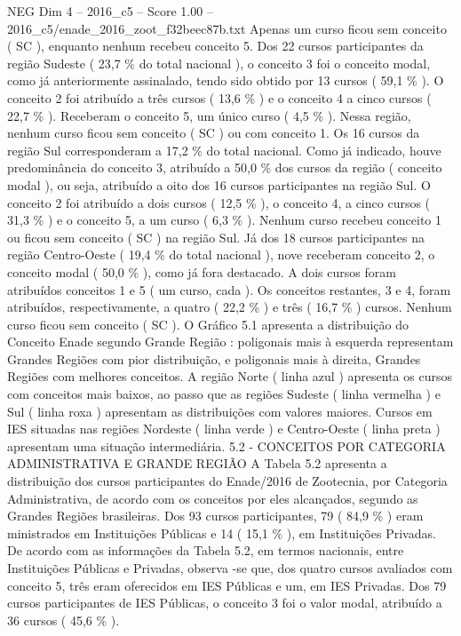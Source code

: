 \begin{textsample}{NEG Dim 4 – 2016\_c5 – Score 1.00 – 2016\_c5/enade\_2016\_zoot\_f32beec87b.txt}
Apenas um curso ficou sem conceito ( SC ), enquanto nenhum recebeu conceito 5.
Dos 22 cursos participantes da região Sudeste ( 23,7 \% do total nacional ), o conceito 3 foi o conceito modal, como já anteriormente assinalado, tendo sido obtido por 13 cursos ( 59,1 \% ).
O conceito 2 foi atribuído a três cursos ( 13,6 \% ) e o conceito 4 a cinco cursos ( 22,7 \% ).
Receberam o conceito 5, um único curso ( 4,5 \% ).
Nessa região, nenhum curso ficou sem conceito ( SC ) ou com conceito 1.
Os 16 cursos da região Sul corresponderam a 17,2 \% do total nacional.
Como já indicado, houve predominância do conceito 3, atribuído a 50,0 \% dos cursos da região ( conceito modal ), ou seja, atribuído a oito dos 16 cursos participantes na região Sul.
O conceito 2 foi atribuído a dois cursos ( 12,5 \% ), o conceito 4, a cinco cursos ( 31,3 \% ) e o conceito 5, a um curso ( 6,3 \% ).
Nenhum curso recebeu conceito 1 ou ficou sem conceito ( SC ) na região Sul.
Já dos 18 cursos participantes na região Centro-Oeste ( 19,4 \% do total nacional ), nove receberam conceito 2, o conceito modal ( 50,0 \% ), como já fora destacado.
A dois cursos foram atribuídos conceitos 1 e 5 ( um curso, cada ).
Os conceitos restantes, 3 e 4, foram atribuídos, respectivamente, a quatro ( 22,2 \% ) e três ( 16,7 \% ) cursos.
Nenhum curso ficou sem conceito ( SC ).
O Gráfico 5.1 apresenta a distribuição do Conceito Enade segundo Grande Região : poligonais mais à esquerda representam Grandes Regiões com pior distribuição, e poligonais mais à direita, Grandes Regiões com melhores conceitos.
A região Norte ( linha azul ) apresenta os cursos com conceitos mais baixos, ao passo que as regiões Sudeste ( linha vermelha ) e Sul ( linha roxa ) apresentam as distribuições com valores maiores.
Cursos em IES situadas nas regiões Nordeste ( linha verde ) e Centro-Oeste ( linha preta ) apresentam uma situação intermediária. 5.2 - CONCEITOS POR CATEGORIA ADMINISTRATIVA E GRANDE REGIÃO A Tabela 5.2 apresenta a distribuição dos cursos participantes do Enade/2016 de Zootecnia, por Categoria Administrativa, de acordo com os conceitos por eles alcançados, segundo as Grandes Regiões brasileiras.
Dos 93 cursos participantes, 79 ( 84,9 \% ) eram ministrados em Instituições Públicas e 14 ( 15,1 \% ), em Instituições Privadas.
De acordo com as informações da Tabela 5.2, em termos nacionais, entre Instituições Públicas e Privadas, observa -se que, dos quatro cursos avaliados com conceito 5, três eram oferecidos em IES Públicas e um, em IES Privadas.
Dos 79 cursos participantes de IES Públicas, o conceito 3 foi o valor modal, atribuído a 36 cursos ( 45,6 \% ).

\end{textsample}
